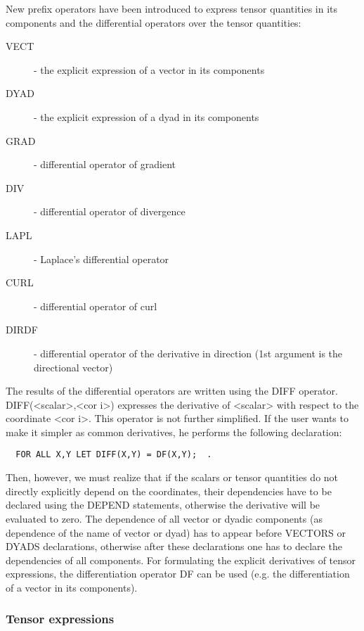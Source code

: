      New  prefix  operators  have  been  introduced  to  express  tensor
quantities  in  its  components  and the differential operators over the
tensor quantities:
\begin{description}
  \item[VECT]  - the explicit expression of a vector in its components
  \item[DYAD]  - the explicit expression of a dyad in its components
  \item[GRAD]  - differential operator of gradient
  \item[DIV]   - differential operator of divergence
  \item[LAPL]  - Laplace's differential operator
  \item[CURL]  - differential operator of curl
  \item[DIRDF] - differential operator of the derivative in direction
          (1st argument is the directional vector)
\end{description}
The results  of the  differential operators  are written  using the DIFF
operator.  DIFF(<scalar>,<cor  i>)  expresses the derivative of <scalar>
with respect to the  coordinate <cor  i>. This  operator is  not further
simplified. If  the user wants to make it simpler as common derivatives,
he performs the following declaration:
\begin{verbatim}
  FOR ALL X,Y LET DIFF(X,Y) = DF(X,Y);  .
\end{verbatim}
Then, however, we must realize that if the scalars or  tensor quantities
do not directly explicitly depend on the coordinates, their dependencies
have  to  be  declared  using  the  DEPEND  statements,   otherwise  the
derivative will  be evaluated  to zero.  The dependence of all vector or
dyadic components (as dependence of the name of  vector or  dyad) has to
appear  before  VECTORS  or  DYADS  declarations,  otherwise after these
declarations one has to declare the dependencies of  all components. For
formulating  the   explicit  derivatives   of  tensor  expressions,  the
differentiation operator DF can be used  (e.g. the  differentiation of a
vector in its components).


\subsubsection{Tensor expressions}


